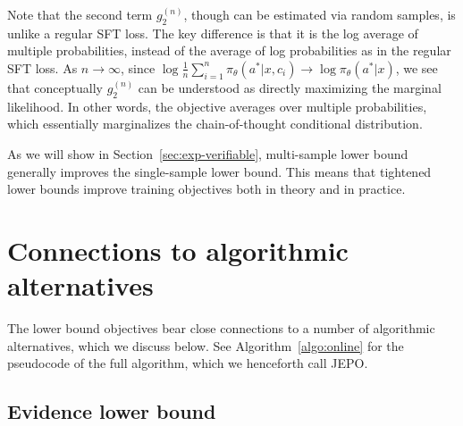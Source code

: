 \documentclass{article}
\theoremstyle{definition}
\begin{document}
Note that the second term $g_2^{(n)}$, though can be estimated via random samples, is unlike a regular SFT loss. The key difference is that it is the log average of multiple probabilities, instead of the average of log probabilities as in the regular SFT loss. As $n\rightarrow\infty$, since $\log \frac{1}{n}\sum_{i=1}^n \pi_\theta(a^*|x,c_i)\rightarrow\log \pi_\theta(a^*|x)$, we see that conceptually $g_2^{(n)}$ can be understood as directly maximizing the marginal likelihood. In other words, the objective averages over multiple probabilities, which essentially marginalizes the chain-of-thought conditional distribution.

As we will show in Section~\ref{sec:exp-verifiable}, multi-sample lower bound generally improves the single-sample lower bound. This means that tightened lower bounds improve training objectives both in theory and in practice.

\section{Connections to algorithmic alternatives}\label{sec:connections}

The lower bound objectives bear close connections to a number of algorithmic alternatives, which we discuss below. See Algorithm~\ref{algo:online} for the pseudocode of the full algorithm, which we henceforth call JEPO.

\subsection{Evidence lower bound}
\end{document}
